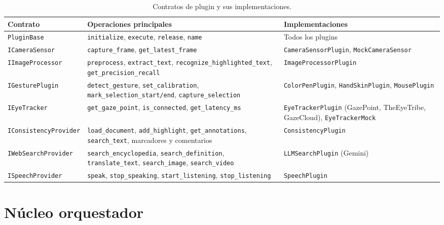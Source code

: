 \begin{table}[H]
\centering
\caption{Contratos de plugin y sus implementaciones.}
\label{tab:contratos}
\footnotesize
\begin{tabularx}{\textwidth}{>{\raggedright\arraybackslash}p{3.7cm} >{\raggedright\arraybackslash}X >{\raggedright\arraybackslash}p{4.0cm}}
\toprule
\textbf{Contrato} & \textbf{Operaciones principales} & \textbf{Implementaciones} \\ \midrule
\texttt{PluginBase} & \texttt{initialize}, \texttt{execute}, \texttt{release}, \texttt{name} & Todos los plugins \\ \midrule
\texttt{ICameraSensor} & \texttt{capture\_frame}, \texttt{get\_latest\_frame} & \texttt{CameraSensorPlugin}, \texttt{MockCameraSensor} \\ \midrule
\texttt{IImageProcessor} & \texttt{preprocess}, \texttt{extract\_text}, \texttt{recognize\_highlighted\_text}, \texttt{get\_precision\_recall} & \texttt{ImageProcessorPlugin} \\ \midrule
\texttt{IGesturePlugin} & \texttt{detect\_gesture}, \texttt{set\_calibration}, \texttt{mark\_selection\_start/end}, \texttt{capture\_selection} & \texttt{ColorPenPlugin}, \texttt{HandSkinPlugin}, \texttt{MousePlugin} \\ \midrule
\texttt{IEyeTracker} & \texttt{get\_gaze\_point}, \texttt{is\_connected}, \texttt{get\_latency\_ms} & \texttt{EyeTrackerPlugin} (GazePoint, TheEyeTribe, GazeCloud), \texttt{EyeTrackerMock} \\ \midrule
\texttt{IConsistencyProvider} & \texttt{load\_document}, \texttt{add\_highlight}, \texttt{get\_annotations}, \texttt{search\_text}, marcadores y comentarios & \texttt{ConsistencyPlugin} \\ \midrule
\texttt{IWebSearchProvider} & \texttt{search\_encyclopedia}, \texttt{search\_definition}, \texttt{translate\_text}, \texttt{search\_image}, \texttt{search\_video} & \texttt{LLMSearchPlugin} (Gemini) \\ \midrule
\texttt{ISpeechProvider} & \texttt{speak}, \texttt{stop\_speaking}, \texttt{start\_listening}, \texttt{stop\_listening} & \texttt{SpeechPlugin} \\ \bottomrule
\end{tabularx}
\end{table}

\section{Núcleo orquestador}


